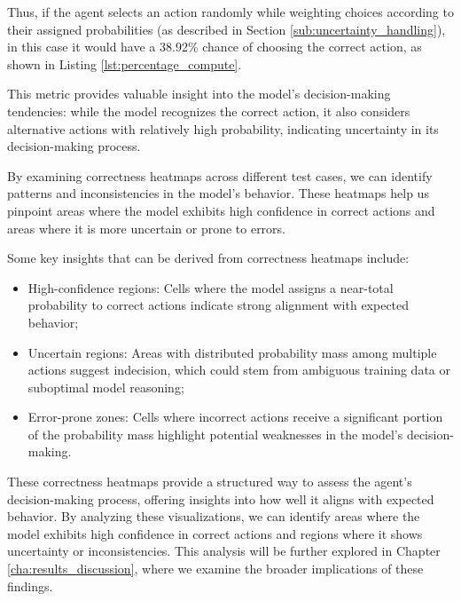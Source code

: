 Thus, if the agent selects an action randomly while weighting choices according to
their assigned probabilities (as described in Section
\ref{sub:uncertainty_handling}), in this case it would have a 38.92\% chance of choosing
the correct action, as shown in Listing \ref{lst:percentage_compute}.

This metric provides valuable insight into the model's decision-making
tendencies: while the model recognizes the correct action, it also considers
alternative actions with relatively high probability, indicating uncertainty in its
decision-making process.

By examining correctness heatmaps across different test cases, we can identify
patterns and inconsistencies in the model's behavior. These heatmaps help us pinpoint
areas where the model exhibits high confidence in correct actions and areas where
it is more uncertain or prone to errors.

Some key insights that can be derived from correctness heatmaps include:
\begin{itemize}
  \item High-confidence regions: Cells where the model assigns a near-total
    probability to correct actions indicate strong alignment with expected
    behavior;

  \item Uncertain regions: Areas with distributed probability mass among
    multiple actions suggest indecision, which could stem from ambiguous training
    data or suboptimal model reasoning;

  \item Error-prone zones: Cells where incorrect actions receive a significant
    portion of the probability mass highlight potential weaknesses in the model's
    decision-making.
\end{itemize}
These correctness heatmaps provide a structured way to assess the agent's
decision-making process, offering insights into how well it aligns with expected
behavior. By analyzing these visualizations, we can identify areas where the model
exhibits high confidence in correct actions and regions where it shows uncertainty
or inconsistencies. This analysis will be further explored in Chapter
\ref{cha:results_discussion}, where we examine the broader implications of these
findings.